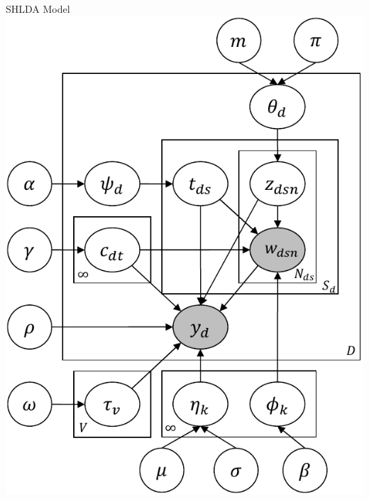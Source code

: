 \documentclass[xcolor=dvipsnames]{beamer}
\begin{document}
\begin{frame}{SHLDA Model}
                    \centering
    \includegraphics[width=.5\linewidth]{shlda/shLDA}
\end{frame}
\end{document}
